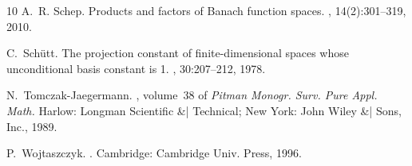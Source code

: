 \documentclass[12pt]{amsart}
\numberwithin{subsection}{section}
\theoremstyle{definition}
\theoremstyle{remark}
\begin{document}
\begin{thebibliography}{10}
A.~R. Schep.
\newblock Products and factors of {Banach} function spaces.
, 14(2):301--319, 2010.

C.~Sch{\"u}tt.
\newblock The projection constant of finite-dimensional spaces whose unconditional basis constant is 1.
, 30:207--212, 1978.

N.~Tomczak-Jaegermann.
, volume~38 of {\em Pitman Monogr. Surv. Pure Appl. Math.}
\newblock Harlow: Longman Scientific \&| Technical; New York: John Wiley \&| Sons, Inc., 1989.

P.~Wojtaszczyk.
.
\newblock Cambridge: Cambridge Univ. Press, 1996.

\end{thebibliography}
\end{document}
